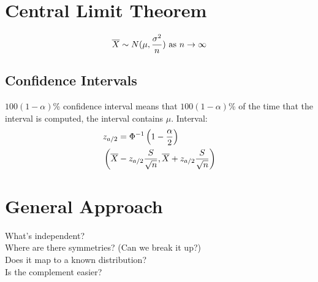 \documentclass[12pt]{amsart}
\begin{document}
\section{Central Limit Theorem}
\begin{align*}
&\overline{X} \sim N(\mu, {\sigma^2 \over n}) \text{ as } n \to \infty \\
\end{align*}
\subsection{Confidence Intervals}
$100(1 - \alpha)$\% confidence interval means that $100(1 - \alpha)$\% of the time that the interval is computed, the interval contains $\mu$. Interval:
\begin{align*}
&z_{a/2} = \Phi^{-1}\left(1 - {\alpha \over 2}\right) \\
&\left(\overline{X} - z_{a/2} {S \over \sqrt{n}}, \overline{X} + z_{a/2} {S \over \sqrt{n}} \right)
\end{align*}
\section{General Approach}
What's independent?\\
Where are there symmetries? (Can we break it up?)\\
Does it map to a known distribution?\\
Is the complement easier?\\
\end{document}
